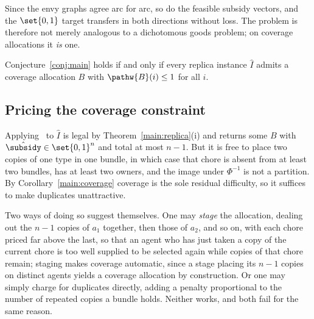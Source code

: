 Since the envy graphs agree arc for arc, so do the feasible subsidy vectors, and
the $\set{0,1}$ target transfers in both directions without loss. The problem is
therefore not merely analogous to a dichotomous goods problem; on coverage
allocations it \emph{is} one.

\begin{corollary}
\label{main:coverage}
Conjecture~\ref{conj:main} holds if and only if every replica instance
$\hat{I}$ admits a coverage allocation $B$ with $\pathw{B}(i) \le 1$ for all $i$.
\end{corollary}

\subsection{Pricing the coverage constraint}
\label{sec:main-pricing}

Applying~\cite{BKNS22} to $\hat{I}$ is legal by Theorem~\ref{main:replica}(i) and
returns some $B$ with $\hat{\subsidy} \in \set{0,1}^n$ and total at most $n-1$.
But it is free to place two copies of one type in one bundle, in which case that
chore is absent from at least two bundles, has at least two owners, and the image
under $\Phi^{-1}$ is not a partition. By Corollary~\ref{main:coverage} coverage
is the sole residual difficulty, so it suffices to make duplicates unattractive.

Two ways of doing so suggest themselves. One may \emph{stage} the allocation,
dealing out the $n-1$ copies of $a_1$ together, then those of $a_2$, and so on,
with each chore priced far above the last, so that an agent who has just taken a
copy of the current chore is too well supplied to be selected again while copies
of that chore remain; staging makes coverage automatic, since a stage placing its
$n-1$ copies on distinct agents yields a coverage allocation by construction.
Or one may simply charge for duplicates directly, adding a penalty proportional
to the number of repeated copies a bundle holds. Neither works, and both fail for
the same reason.

